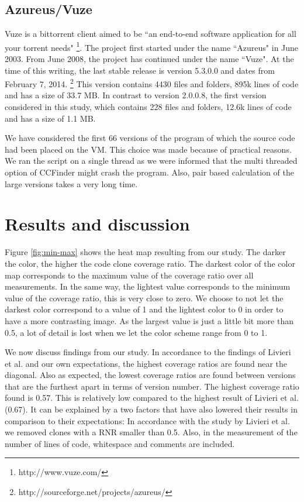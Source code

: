 \documentclass[a4paper,twoside, twocolumn, 11pt]{article}
\numberwithin{equation}{section}
\begin{document}
\subsection{Azureus/Vuze}
Vuze is a bittorrent client aimed to be ``an end-to-end software application for all your torrent needs" \footnote{http://www.vuze.com/}.
The project first started under the name ``Azureus" in June 2003.
From June 2008, the project has continued under the name ``Vuze".
At the time of this writing, the last stable release is version 5.3.0.0 and dates from February 7, 2014. \footnote{http://sourceforge.net/projects/azureus/}
This version contains 4430 files and folders, 895k lines of code and has a size of 33.7 MB. 
In contrast to version 2.0.0.8, the first version considered in this study, which contains 228 files and folders, 12.6k lines of code and has a size of 1.1 MB.

We have considered the first 66 versions of the program of which the source code had been placed on the VM. 
This choice was made because of practical reasons. 
We ran the script on a single thread as we were informed that the multi threaded option of CCFinder might crash the program. 
Also, pair based calculation of the large versions takes a very long time.

\section{Results and discussion}
Figure \ref{fig:min-max} shows the heat map resulting from our study. 
The darker the color, the higher the code clone coverage ratio. 
The darkest color of the color map corresponds to the maximum value of the coverage ratio over all measurements.
In the same way, the lightest value corresponds to the minimum value of the coverage ratio, this is very close to zero. 
We choose to not let the darkest color correspond to a value of 1 and the lightest color to 0 in order to have a more contrasting image.
As the largest value is just a little bit more than 0.5, a lot of detail is lost when we let the color scheme range from 0 to 1.

We now discuss findings from our study.
In accordance to the findings of Livieri et al. and our own expectations, the highest coverage ratios are found near the diagonal.
Also as expected, the lowest coverage ratios are found between versions that are the furthest apart in terms of version number.
The highest coverage ratio found is 0.57. This is relatively low compared to the highest result of Livieri et al. (0.67).
It can be explained by a two factors that have also lowered their results in comparison to their expectations:
In accordance with the study by Livieri et al. we removed clones with a RNR smaller than 0.5. 
Also, in the measurement of the number of lines of code, whitespace and comments are included.
\end{document}
